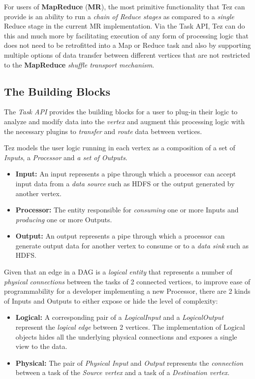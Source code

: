 \documentclass[twocolumn]{article}
\begin{document}
For users of \textbf{MapReduce} (\textbf{MR}), the most primitive
functionality that Tez can provide is an ability to run a \emph{chain of
Reduce stages} as compared to a \emph{single} Reduce stage in the
current MR implementation. Via the Task API, Tez can do this and much
more by facilitating execution of any form of processing logic that does
not need to be retrofitted into a Map or Reduce task and also by
supporting multiple options of data transfer between different vertices
that are not restricted to the \textbf{MapReduce} \emph{shuffle
transport mechanism}.

\subsection{The Building Blocks}

The \textit{Task API} provides the building blocks for a user to plug-in their
logic to analyze and modify data into the \textit{vertex} and augment this
processing logic with the necessary plugins to \emph{transfer} and
\emph{route} data between vertices.

Tez models the user logic running in each vertex as a composition of a
set of \textit{Inputs}, a \textit{Processor} and \textit{a set of Outputs}.

\begin{itemize}
\item
  \textbf{Input:} An input represents a pipe through which a processor
  can accept input data from a \emph{data source} such as HDFS or the
  output generated by another vertex.
\item
  \textbf{Processor:} The entity responsible for \emph{consuming} one or
  more Inputs and \emph{producing} one or more Outputs.
\item
  \textbf{Output:} An output represents a pipe through which a processor
  can generate output data for another vertex to consume or to a
  \emph{data sink} such as HDFS.
\end{itemize}

Given that an edge in a DAG is a \textit{logical entity} that represents a number
of \textit{physical connections} between the tasks of 2 connected vertices, to
improve ease of programmability for a developer implementing a new
Processor, there are 2 kinds of Inputs and Outputs to either expose or
hide the level of complexity:

\begin{itemize}
\item
  \textbf{Logical:} A corresponding pair of a \emph{LogicalInput} and a
  \emph{LogicalOutput} represent the \emph{logical edge} between 2
  vertices. The implementation of Logical objects hides all the
  underlying physical connections and exposes a single view to the
  data.
\item
  \textbf{Physical:} The pair of \textit{Physical Input} and \textit{Output} represents
  the \emph{connection} between a task of the \emph{Source vertex} and a
  task of a \emph{Destination vertex}.
\end{itemize}
\end{document}
